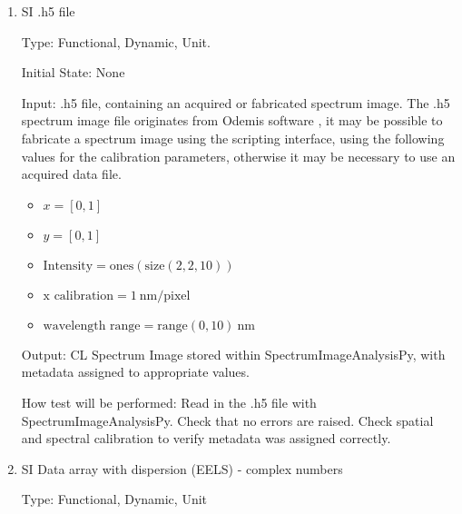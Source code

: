 \documentclass[12pt, titlepage]{article}
\newcommand{\progname}{SpectrumImageAnalysisPy}
\begin{document}
\begin{enumerate}
Output: EELS Spectrum Image stored within \progname{}, with metadata assigned to appropriate values

How test will be performed: Read in the .dm3 file with \progname{}. Check that no errors are raised. Display the spectrum image to manually check that the data was read in correctly. Check spatial and spectral calibration to verify metadata was assigned correctly.


\item{SI .h5 file}

Type: Functional, Dynamic, Unit.

Initial State: None

Input: .h5 file, containing an acquired or fabricated spectrum image. The .h5 spectrum image file originates from Odemis software \cite{bv_odemis:_nodate}, it may be possible to fabricate a spectrum image using the scripting interface, using the following values for the calibration parameters, otherwise it may be necessary to use an acquired data file.

\begin{itemize}
	\item $x = [0, 1]$
	\item $y = [0, 1]$
	\item $\text{Intensity} = \text{ones}(\text{size}(2,2,10))$
	\item $\text{x calibration} = 1\ \si{\nano\metre}/\text{pixel}$
	\item $\text{wavelength range} = \text{range}(0, 10)\ \si{\nano\metre}$
\end{itemize}

Output: CL Spectrum Image stored within \progname, with metadata assigned to appropriate values.
					
How test will be performed: Read in the .h5 file with \progname{}. Check that no errors are raised. Check spatial and spectral calibration to verify metadata was assigned correctly.

\item{SI Data array with dispersion (EELS) - complex numbers}

Type: Functional, Dynamic, Unit


\end{enumerate}
\end{document}
